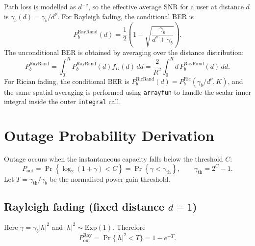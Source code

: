 \documentclass[12pt,a4paper]{article}
\begin{document}
Path loss is modelled as $d^{-\nu}$, so the effective average SNR for a user at distance $d$ is $\gamma_b(d)=\gamma_b/d^{\nu}$. For Rayleigh fading, the conditional BER is
\begin{equation}
    P_b^{\text{RayRand}}(d)=\frac{1}{2}\left(1-\sqrt{\frac{\gamma_b}{d^{\nu}+\gamma_b}}\right).
\end{equation}
The unconditional BER is obtained by averaging over the distance distribution:
\begin{equation}
    P_b^{\text{RayRand}}=\int_0^R P_b^{\text{RayRand}}(d)f_D(d)\,dd
    =\frac{2}{R^2}\int_0^R d\,P_b^{\text{RayRand}}(d)\,dd.
\end{equation}
For Rician fading, the conditional BER is $P_b^{\text{RicRand}}(d)=P_b^{\text{Ric}}(\gamma_b/d^{\nu},K)$, and the same spatial averaging is performed using \texttt{arrayfun} to handle the scalar inner integral inside the outer \texttt{integral} call.

\section{Outage Probability Derivation}\label{app:outage}
Outage occurs when the instantaneous capacity falls below the threshold $C$:
\begin{equation}
    P_{\text{out}}=\Pr\left\{\log_2(1+\gamma)<C\right\}
    =\Pr\left\{\gamma<\gamma_{\text{th}}\right\},
    \qquad \gamma_{\text{th}}=2^C-1.
\end{equation}
Let $T=\gamma_{\text{th}}/\gamma_b$ be the normalised power-gain threshold.

\subsection{Rayleigh fading (fixed distance $d=1$)}
Here $\gamma=\gamma_b|h|^2$ and $|h|^2\sim\text{Exp}(1)$. Therefore
\begin{equation}
    P_{\text{out}}^{\text{Ray}}=\Pr\{|h|^2<T\}=1-e^{-T}.
\end{equation}

\end{document}
